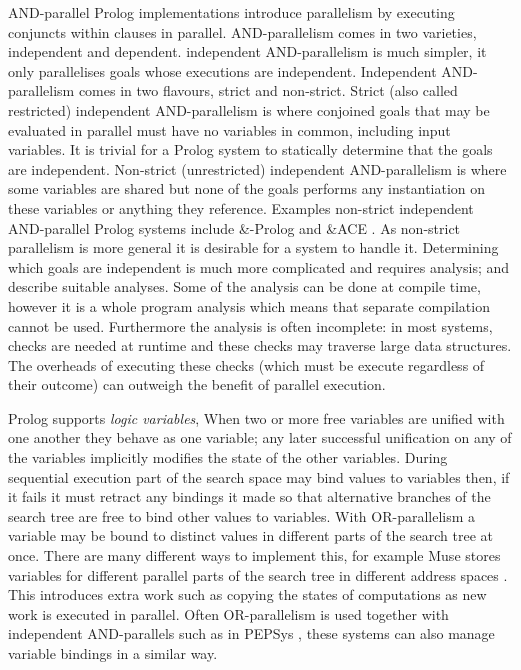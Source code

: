 AND-parallel Prolog implementations introduce parallelism by executing
conjuncts within clauses in parallel.
AND-parallelism comes in two varieties, independent and dependent.
independent AND-parallelism is much simpler, it only parallelises goals
whose executions are independent.
Independent AND-parallelism comes in two flavours, strict and non-strict.
Strict (also called restricted) independent AND-parallelism is where
conjoined goals that may be evaluated in parallel must have no variables in
common, including input variables.
It is trivial for a Prolog system to statically determine that the goals are
independent.
Non-strict (unrestricted) independent AND-parallelism is where some variables
are shared but none of the goals performs any instantiation on these variables
or anything they reference.
Examples non-strict independent AND-parallel Prolog systems include \&-Prolog 
\citep{Hermenegildo:1991:and-parallel,
DBLP:journals/jlp/MuthukumarBBH99}
and \&ACE \citep{gupta:1991:ace}.
As non-strict parallelism is more general it is desirable for a system to
handle it.
Determining which goals are independent is much more complicated and
requires analysis;
\citet{DBLP:journals/tcs/GrasH09} and \citet{Hermenegildo1995} describe
suitable analyses.
Some of the analysis can be done at compile time,
however it is a whole program analysis which means that separate compilation
cannot be used.
Furthermore the analysis is often incomplete:
in most systems, checks are needed at runtime and these checks may traverse
large data structures.
The overheads of executing these checks
(which must be execute regardless of their outcome)
can outweigh the benefit of parallel execution.

Prolog supports \emph{logic variables},
When two or more free variables are unified with one another they behave as one
variable;
any later successful unification on any of the variables implicitly modifies
the state of the other variables.
During sequential execution
part of the search space may bind values to variables then,
if it fails it must retract any bindings it made so that alternative
branches of the search tree are free to bind other values to variables.
With OR-parallelism a variable may be bound to distinct values in different
parts of the search tree at once.
There are many different ways to implement this,
for example Muse stores variables for different parallel parts of the search
tree in different address spaces \citep{ali:1990:muse}.
This introduces extra work such as copying the states of computations as new
work is executed in parallel.
Often OR-parallelism is used together with independent AND-parallels
such as in PEPSys \citep{baron:1988:pepsys},
these systems can also manage variable bindings in a similar way.

